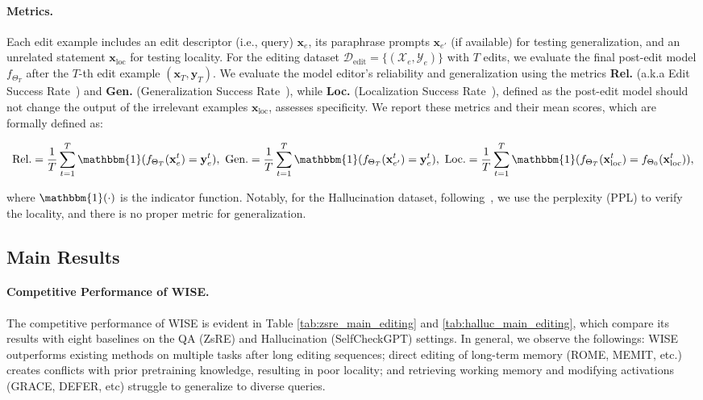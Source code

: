 \paragraph{Metrics.} 
Each edit example includes an edit descriptor (i.e., query) $\mathbf{x}_e$, its paraphrase prompts $\mathbf{x}_{e'}$ (if available) for testing generalization, and an unrelated statement $\mathbf{x}_{\text{loc}}$ for testing locality. 
For the editing dataset $\mathcal{D}_{\text{edit}}= \{(\mathcal{X}_e, \mathcal{Y}_e)\}$ with $T$ edits, we evaluate the final post-edit model $f_{\Theta_{T}}$ after the $T$-th edit example $(\mathbf{x}_T, \mathbf{y}_T)$. 
We evaluate the model editor's reliability and generalization using the metrics \textbf{Rel.} (a.k.a Edit Success Rate~\cite{grace}) and \textbf{Gen.} (Generalization Success Rate~\cite{knowledge_editing_survey_2}), while \textbf{Loc.} (Localization Success Rate~\cite{knowledge_editing_survey_2}), defined as the post-edit model should not change the output of the irrelevant examples $\mathbf{x}_{\text{loc}}$, assesses specificity.
We report these metrics and their mean scores, which are formally defined as:
\begin{scriptsize}
\begin{equation}\label{equ:metrics}
        \text{Rel}. = \frac{1}{T}\sum\limits_{t=1}^{T} \mathbbm{1}(f_{\Theta_{T}}(\mathbf{x}_e^t) = \mathbf{y}_e^t),\
        \text{Gen}. = \frac{1}{T}\sum\limits_{t=1}^{T} \mathbbm{1}(f_{\Theta_{T}}(\mathbf{x}_{e'}^t) = \mathbf{y}_e^t),\
        \text{Loc}. = \frac{1}{T}\sum\limits_{t=1}^{T} \mathbbm{1}(f_{\Theta_{T}}(\mathbf{x}_{\text{loc}}^{t}) = f_{\Theta_{0}}(\mathbf{x}_{\text{loc}}^{t})),
\end{equation}
\end{scriptsize}
where $\mathbbm{1}(\cdot)$ is the indicator function. Notably, for the Hallucination dataset, following~\cite{grace}, we use the perplexity (PPL) to verify the locality, and there is no proper metric for generalization.



\subsection{Main Results} \label{subsec: main_results}
\paragraph{Competitive Performance of WISE.} 
The competitive performance of WISE is evident in Table \ref{tab:zsre_main_editing} and \ref{tab:halluc_main_editing}, which compare its results with eight baselines on the QA (ZsRE) and Hallucination (SelfCheckGPT) settings. 
In general, we observe the followings:  WISE outperforms existing methods on multiple tasks after long editing sequences;  direct editing of long-term memory (ROME, MEMIT, etc.) creates conflicts with prior pretraining knowledge, resulting in poor locality; and  retrieving working memory and modifying activations (GRACE, DEFER, etc) struggle to generalize to diverse queries.

